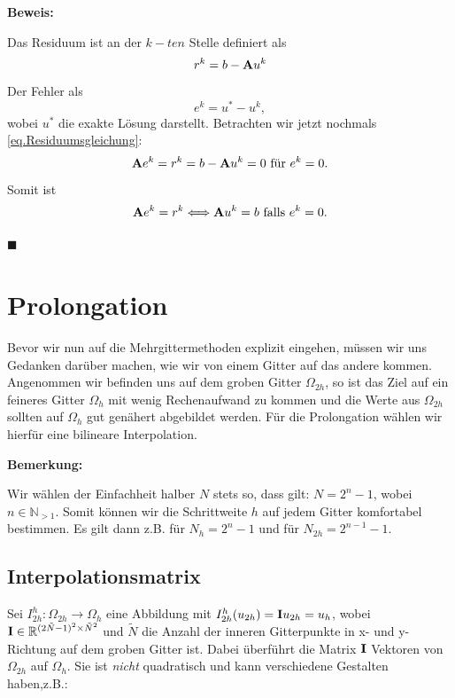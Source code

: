 \textbf{Beweis:}

Das Residuum ist an der $k-ten$ Stelle definiert als 
\begin{equation}
r^{k} = b - {\textbf{A}}u^{k}
\end{equation}
Der Fehler als
\begin{equation}
e^{k} = u^{*} - u^{k},
\end{equation}
wobei $u^{*}$ die exakte Lösung darstellt.
Betrachten wir jetzt nochmals \autoref{eq.Residuumsgleichung}:
\begin{equation}
{\textbf{A}}e^{k} = r^{k} = b - {\textbf{A}}u^{k} = 0 \textnormal{ für } e^{k} = 0.
\end{equation}
Somit ist
\begin{equation}
{\textbf{A}}e^{k} = r^{k} \Longleftrightarrow {\textbf{A}}u^{k} = b \textnormal{ falls } e^{k} = 0.
\end{equation}
\begin{flushright}
$\blacksquare$
\end{flushright}

\section{Prolongation}

Bevor wir nun auf die Mehrgittermethoden explizit eingehen, müssen wir uns Gedanken darüber machen, wie wir von einem Gitter auf das andere kommen. Angenommen wir befinden uns auf dem groben Gitter $\Omega_{2h}$, so ist das Ziel auf ein feineres Gitter $\Omega_{h}$ mit wenig Rechenaufwand zu kommen und die Werte aus $\Omega_{2h}$ sollten auf $\Omega_{h}$ gut genähert abgebildet werden. Für die Prolongation wählen wir hierfür eine bilineare Interpolation.

\textbf{Bemerkung:}

Wir wählen der Einfachheit halber $N$ stets so, dass gilt: $N = 2^{n} - 1$, wobei $n \in \mathbb{N}_{>1}$. Somit können wir die Schrittweite $h$ auf jedem Gitter komfortabel bestimmen. Es gilt dann z.B. für $N_{h} = 2^{n} - 1$ und für $N_{2h} = 2^{n-1} - 1$.

\subsection{Interpolationsmatrix}

Sei $I^{h}_{2h}: \Omega_{2h} \longrightarrow \Omega_{h}$ eine Abbildung mit $I_{2h}^{h}(u_{2h}) = {\textbf{I}}u_{2h} = u_{h}$, wobei ${\textbf{I}} \in \mathbb{R}^{(2 \tilde N - 1)^{2} \times \tilde N^{2}}$ und $\tilde N$ die Anzahl der inneren Gitterpunkte in x- und y-Richtung auf dem groben Gitter ist. Dabei überführt die Matrix ${\textbf{I}}$ Vektoren von $\Omega_{2h}$ auf $\Omega_{h}$. Sie ist \textit{nicht} quadratisch und kann verschiedene Gestalten haben,z.B.:

